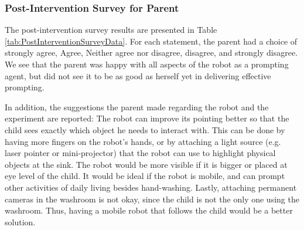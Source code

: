 \subsubsection{Post-Intervention Survey for Parent}
The post-intervention survey results are presented in Table \ref{tab:PostInterventionSurveyData}.  For each statement, the parent had a choice of strongly agree, Agree, Neither agree nor disagree, disagree, and strongly disagree.  We see that the parent was happy with all aspects of the robot as a prompting agent, but did not see it to be as good as herself yet in delivering effective prompting.

In addition, the suggestions the parent made regarding the robot and the experiment are reported:  The robot can improve its pointing better so that the child sees exactly which object he needs to interact with.  This can be done by having more fingers on the robot's hands, or by attaching a light source (e.g. laser pointer or mini-projector) that the robot can use to highlight physical objects at the sink.  The robot would be more visible if it is bigger or placed at eye level of the child.  It would be ideal if the robot is mobile, and can prompt other activities of daily living besides hand-washing.  Lastly, attaching permanent cameras in the washroom is not okay, since the child is not the only one using the washroom.  Thus, having a mobile robot that follows the child would be a better solution.




